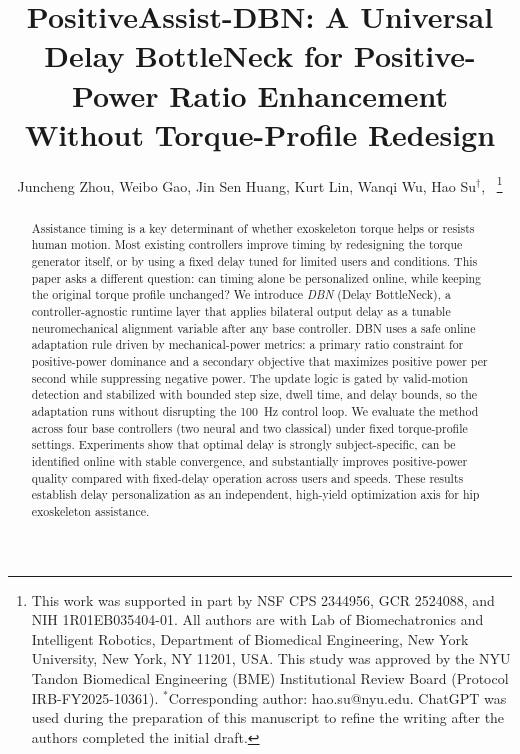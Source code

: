 \documentclass[lettersize,journal]{IEEEtran}
\begin{document}
\title{PositiveAssist-DBN: A Universal Delay BottleNeck for Positive-Power Ratio Enhancement Without Torque-Profile Redesign}
\author{Juncheng Zhou,   
        Weibo Gao,
        Jin Sen Huang, Kurt Lin, Wanqi Wu,
        Hao Su$^\dagger$,~
\thanks{This work was supported in part by NSF CPS 2344956, GCR 2524088, and NIH 1R01EB035404-01. 
All authors are with Lab of Biomechatronics and Intelligent Robotics, Department of Biomedical Engineering, New York University, New York, NY 11201, USA. This study was approved by the NYU Tandon Biomedical Engineering (BME) Institutional Review Board (Protocol IRB-FY2025-10361). $^*$Corresponding author: hao.su@nyu.edu. ChatGPT was used during the preparation of
this manuscript to refine the writing after the authors completed the initial
draft.}}

\maketitle

\begin{abstract}
Assistance timing is a key determinant of whether exoskeleton torque helps or resists human motion. Most existing controllers improve timing by redesigning the torque generator itself, or by using a fixed delay tuned for limited users and conditions. This paper asks a different question: can timing alone be personalized online, while keeping the original torque profile unchanged? We introduce \emph{DBN} (Delay BottleNeck), a controller-agnostic runtime layer that applies bilateral output delay as a tunable neuromechanical alignment variable after any base controller. DBN uses a safe online adaptation rule driven by mechanical-power metrics: a primary ratio constraint for positive-power dominance and a secondary objective that maximizes positive power per second while suppressing negative power. The update logic is gated by valid-motion detection and stabilized with bounded step size, dwell time, and delay bounds, so the adaptation runs without disrupting the 100~Hz control loop. We evaluate the method across four base controllers (two neural and two classical) under fixed torque-profile settings. Experiments show that optimal delay is strongly subject-specific, can be identified online with stable convergence, and substantially improves positive-power quality compared with fixed-delay operation across users and speeds. These results establish delay personalization as an independent, high-yield optimization axis for hip exoskeleton assistance.
\end{abstract}
\end{document}
